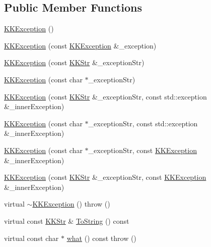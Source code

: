 \subsection*{Public Member Functions}
\begin{DoxyCompactItemize}
\item 
\hyperlink{class_k_k_b_1_1_k_k_exception_a3ab2819dbec1acd42cee965e51aa4ccb}{K\+K\+Exception} ()
\item 
\hyperlink{class_k_k_b_1_1_k_k_exception_a16aba1c3d205611fa0a5dbc9f78ee84d}{K\+K\+Exception} (const \hyperlink{class_k_k_b_1_1_k_k_exception}{K\+K\+Exception} \&\+\_\+exception)
\item 
\hyperlink{class_k_k_b_1_1_k_k_exception_a9505cf26272a2d7a3ca4a5ed19f46877}{K\+K\+Exception} (const \hyperlink{class_k_k_b_1_1_k_k_str}{K\+K\+Str} \&\+\_\+exception\+Str)
\item 
\hyperlink{class_k_k_b_1_1_k_k_exception_a1e650cbf594edbd3ee231f11b098df9e}{K\+K\+Exception} (const char $\ast$\+\_\+exception\+Str)
\item 
\hyperlink{class_k_k_b_1_1_k_k_exception_a830eb03986c23ef438562bbb7adbdf9b}{K\+K\+Exception} (const \hyperlink{class_k_k_b_1_1_k_k_str}{K\+K\+Str} \&\+\_\+exception\+Str, const std\+::exception \&\+\_\+inner\+Exception)
\item 
\hyperlink{class_k_k_b_1_1_k_k_exception_ae911463f46fef87b623ff7c54a4988cd}{K\+K\+Exception} (const char $\ast$\+\_\+exception\+Str, const std\+::exception \&\+\_\+inner\+Exception)
\item 
\hyperlink{class_k_k_b_1_1_k_k_exception_a3f9273ed8c1c83d7bc53d2d72238a691}{K\+K\+Exception} (const char $\ast$\+\_\+exception\+Str, const \hyperlink{class_k_k_b_1_1_k_k_exception}{K\+K\+Exception} \&\+\_\+inner\+Exception)
\item 
\hyperlink{class_k_k_b_1_1_k_k_exception_abebe565c76ebcc389e3506e2399badfd}{K\+K\+Exception} (const \hyperlink{class_k_k_b_1_1_k_k_str}{K\+K\+Str} \&\+\_\+exception\+Str, const \hyperlink{class_k_k_b_1_1_k_k_exception}{K\+K\+Exception} \&\+\_\+inner\+Exception)
\item 
virtual \hyperlink{class_k_k_b_1_1_k_k_exception_a8600cf9e6176fec2dcbb23052c36de8a}{$\sim$\+K\+K\+Exception} ()  throw ()
\item 
virtual const \hyperlink{class_k_k_b_1_1_k_k_str}{K\+K\+Str} \& \hyperlink{class_k_k_b_1_1_k_k_exception_a9d565e887e90968c5e306c1ea94c6894}{To\+String} () const 
\item 
virtual const char $\ast$ \hyperlink{class_k_k_b_1_1_k_k_exception_aae7f05aaeeb741d494fbfbe97bfd3a81}{what} () const   throw ()
\end{DoxyCompactItemize}


